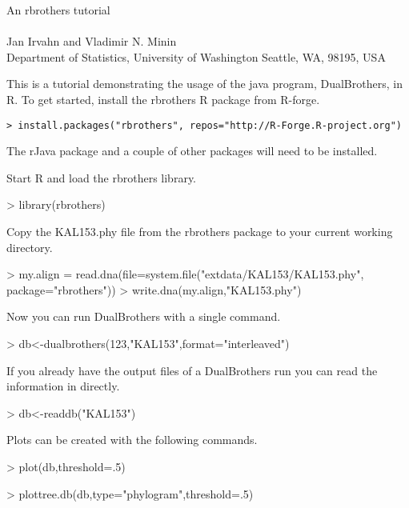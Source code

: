 \documentclass[12pt]{article}
\begin{document}
\begin{center}
  {\LARGE An rbrothers tutorial}\\\ \\
  {Jan Irvahn and Vladimir N. Minin \\ 
    Department of Statistics, University of Washington Seattle, WA, 98195, USA
  }
\end{center}

This is a tutorial demonstrating the usage of the java program, DualBrothers, in R.  To get started, install the rbrothers R package from R-forge. 
\begin{verbatim}
> install.packages("rbrothers", repos="http://R-Forge.R-project.org")
\end{verbatim}
The rJava package and a couple of other packages will need to be installed.

Start R and load the rbrothers library.
\begin{Schunk}
\begin{Sinput}
> library(rbrothers)
\end{Sinput}
\end{Schunk}

Copy the KAL153.phy file from the rbrothers package to your current working directory.
\begin{Schunk}
\begin{Sinput}
> my.align = read.dna(file=system.file("extdata/KAL153/KAL153.phy", 
 	  	   package="rbrothers"))
> write.dna(my.align,"KAL153.phy")
\end{Sinput}
\end{Schunk}

Now you can run DualBrothers with a single command.
\begin{Schunk}
\begin{Sinput}
> db<-dualbrothers(123,"KAL153",format="interleaved")
\end{Sinput}
\end{Schunk}

If you already have the output files of a DualBrothers run you can read the information in directly.
\begin{Schunk}
\begin{Sinput}
> db<-readdb("KAL153")
\end{Sinput}
\end{Schunk}

Plots can be created with the following commands.

\begin{Schunk}
\begin{Sinput}
> plot(db,threshold=.5)
\end{Sinput}
\end{Schunk}
\begin{Schunk}
\begin{Sinput}
> plottree.db(db,type="phylogram",threshold=.5)
\end{Sinput}
\end{Schunk}
\end{document}
